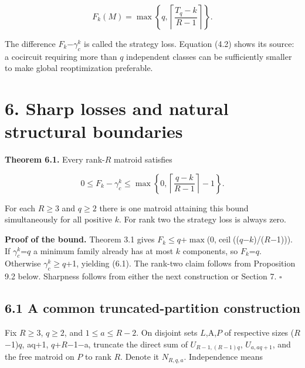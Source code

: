 \documentclass[11pt]{article}
\begin{document}
\[
F_k(M)=\max\left\{q,\left\lceil\frac{T_q-k}{R-1}\right\rceil\right\}.       \tag{5.2}
\]

The difference \(F_k\)\ensuremath{-}\(\gamma_c^k\) is called the strategy loss. Equation (4.2) shows its source: a cocircuit requiring more than \(q\) independent classes can be sufficiently smaller to make global reoptimization preferable.

\section*{6. Sharp losses and natural structural boundaries}

\textbf{Theorem 6.1.} Every rank-\(R\) matroid satisfies

\[
0\le F_k-\gamma_c^k\le
\max\left\{0,\left\lceil\frac{q-k}{R-1}\right\rceil-1\right\}.          \tag{6.1}
\]

For each \(R\ge3\) and \(q\ge2\) there is one matroid attaining this bound simultaneously for all positive \(k\). For rank two the strategy loss is always zero.

\textbf{Proof of the bound.} Theorem 3.1 gives \(F_k\)\(\le\)\(q\)+\(\max\)(0,\(\operatorname{ceil}\)((\(q\)\ensuremath{-}\(k\))/(\(R\)\ensuremath{-}1))). If \(\gamma_c^k\)=\(q\) a minimum family already has at most \(k\) components, so \(F_k\)=\(q\). Otherwise \(\gamma_c^k\)\(\ge\)\(q\)+1, yielding (6.1). The rank-two claim follows from Proposition 9.2 below. Sharpness follows from either the next construction or Section 7. \hfill\ensuremath{\square}

\subsection*{6.1 A common truncated-partition construction}

Fix \(R\ge3\), \(q\ge2\), and \(1\le a\le R-2\). On disjoint sets \(L\),A,\(P\) of respective sizes (\(R\)\ensuremath{-}1)\(q\), aq+1, \(q\)+\(R\)\ensuremath{-}1\ensuremath{-}a, truncate the direct sum of \(U_{R-1,(R-1)q}\), \(U_{a,aq+1}\), and the free matroid on \(P\) to rank \(R\). Denote it \(N_{R,q,a}\). Independence means
\end{document}
